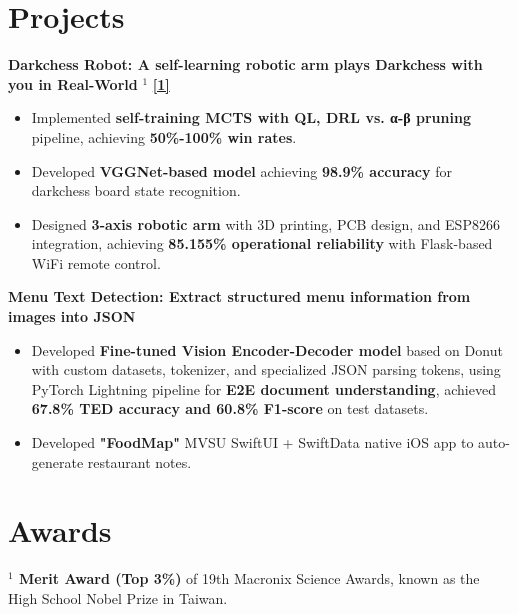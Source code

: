 \documentclass[a4paper,11pt]{article}
\begin{document}
\section{Projects}
\noindent \textbf{Darkchess Robot: A self-learning robotic arm plays Darkchess with you in Real-World} \href{https://github.com/ryanlinjui/darkchess-robot}{\color{textcolor}\raisebox{0pt}{}} \hyperlink{award1}{\color{textcolor}\raisebox{0pt}{}$^{1}$} \hyperlink{patent1}{\textbf{\color{textcolor}[1]}}
\begin{itemize}
    \item Implemented \textbf{self-training MCTS with QL, DRL vs. α-β pruning} pipeline, achieving \textbf{50\%-100\% win rates}.
    \item Developed \textbf{VGGNet-based model} achieving \textbf{98.9\% accuracy} for darkchess board state recognition.
    \item Designed \textbf{3-axis robotic arm} with 3D printing, PCB design, and ESP8266 integration, achieving \textbf{85.155\% operational reliability} with Flask-based WiFi remote control.
\end{itemize}

\vspace{0.25em}

\noindent \textbf{Menu Text Detection: Extract structured menu information from images into JSON} \href{https://github.com/ryanlinjui/menu-text-detection}{\color{textcolor}\raisebox{0pt}{}}
\begin{itemize}
    \item Developed \textbf{Fine-tuned Vision Encoder-Decoder model} based on Donut with custom datasets, tokenizer, and specialized JSON parsing tokens, using PyTorch Lightning pipeline for \textbf{E2E document understanding}, achieved \textbf{67.8\% TED accuracy and 60.8\% F1-score} on test datasets.
    \item Developed \textbf{"FoodMap"} \href{https://github.com/ryanlinjui/FoodMap}{\color{textcolor}\raisebox{0pt}{}} MVSU SwiftUI + SwiftData native iOS app to auto-generate restaurant notes.
\end{itemize}

\section{Awards}
\noindent \hypertarget{award1}{\label{award1}} \textbf{\raisebox{0pt}{}$^{1}$ Merit Award (Top 3\%)} of 19th Macronix Science Awards, known as the High School Nobel Prize in Taiwan.
\end{document}
